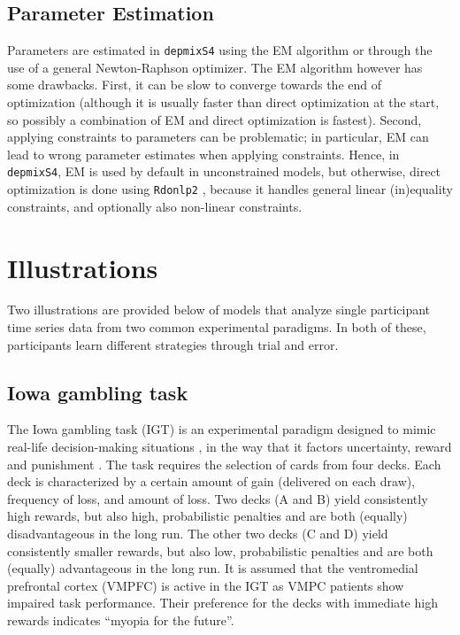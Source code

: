 \documentclass[a4paper,12pt,man]{apa} %
\newcommand{\pkg}{\texttt}
\begin{document}



\subsection{Parameter Estimation}

Parameters are estimated in \pkg{depmixS4} using the EM algorithm or
through the use of a general Newton-Raphson optimizer.  The EM
algorithm however has some drawbacks.  First, it can be slow to
converge towards the end of optimization (although it is usually
faster than direct optimization at the start, so possibly a
combination of EM and direct optimization is fastest).  Second,
applying constraints to parameters can be problematic; in particular,
EM can lead to wrong parameter estimates when applying constraints.
Hence, in \pkg{depmixS4}, EM is used by default in unconstrained
models, but otherwise, direct optimization is done using \pkg{Rdonlp2}
\cite{Tamura2007,Spellucci2002}, because it handles general linear
(in)equality constraints, and optionally also non-linear constraints.


\section{Illustrations}


Two illustrations are provided below of models that analyze single
participant time series data from two common experimental paradigms.
In both of these, participants learn different strategies through
trial and error.


\subsection{Iowa gambling task}

The Iowa gambling task (IGT) is an experimental paradigm designed to
mimic real-life decision-making situations \cite{Bechara1994}, in the
way that it factors uncertainty, reward and punishment
\cite{Dunn2006}.  The task requires the selection of cards from four
decks.  Each deck is characterized by a certain amount of gain
(delivered on each draw), frequency of loss, and amount of loss.  Two
decks (A and B) yield consistently high rewards, but also high,
probabilistic penalties and are both (equally) disadvantageous in the
long run.  The other two decks (C and D) yield consistently smaller
rewards, but also low, probabilistic penalties and are both (equally)
advantageous in the long run.  It is assumed that the ventromedial
prefrontal cortex (VMPFC) is active in the IGT as VMPC patients show
impaired task performance.  Their preference for the decks with
immediate high rewards indicates ``myopia for the future''.
\end{document}
